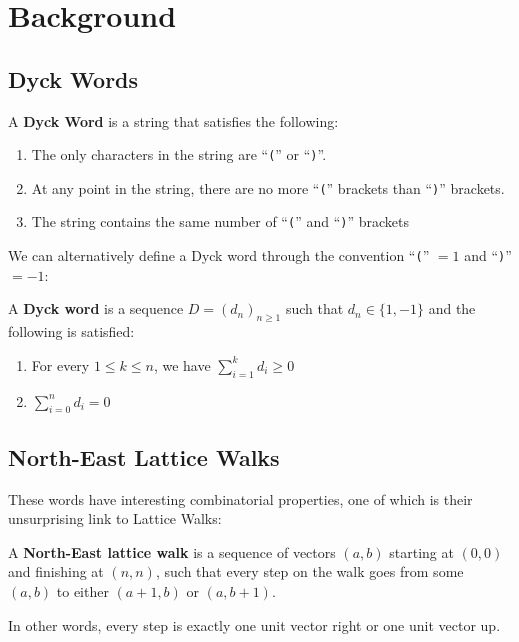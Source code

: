 \section{Background}

\subsection{Dyck Words}
\begin{definition}
    A \textbf{Dyck Word} is a string that satisfies the following:
    \begin{enumerate}
        \item The only characters in the string are ``\texttt{(}'' or ``\texttt{)}''.
        \item At any point in the string, there are no more ``\texttt{(}'' brackets than ``\texttt{)}'' brackets.
        \item The string contains the same number of ``\texttt{(}'' and ``\texttt{)}'' brackets
    \end{enumerate}
\end{definition}

We can alternatively define a Dyck word through the convention ``\texttt{(}'' $= 1$ and ``\texttt{)}'' $= -1$:

\begin{definition}
    \label{def:seqDyck}
    A \textbf{Dyck word} is a sequence $D=(d_{n})_{n\geq 1}$ such that ${d_{n}\in\{1, -1\}}$ and the following is satisfied:
    \begin{enumerate}
        \item For every \! $1 \leq k \leq n$, we have \! $\sum_{i = 1}^{k} d_{i} \geq 0$ 
        \item $\sum_{i = 0}^{n} d_{i} = 0$
    \end{enumerate} 
\end{definition}

\subsection{North-East Lattice Walks}
These words have interesting combinatorial properties, one of which is their unsurprising link to Lattice Walks:

\begin{definition} 
    A \textbf{North-East lattice walk} is a sequence of vectors $(a, b)$ starting at $(0, 0)$ and finishing at $(n, n)$, such that every step on the walk goes from some $(a, b)$ to either $(a+1, b)$ or $(a, b+1)$.
\end{definition}
In other words, every step is exactly one unit vector right or one unit vector up.

